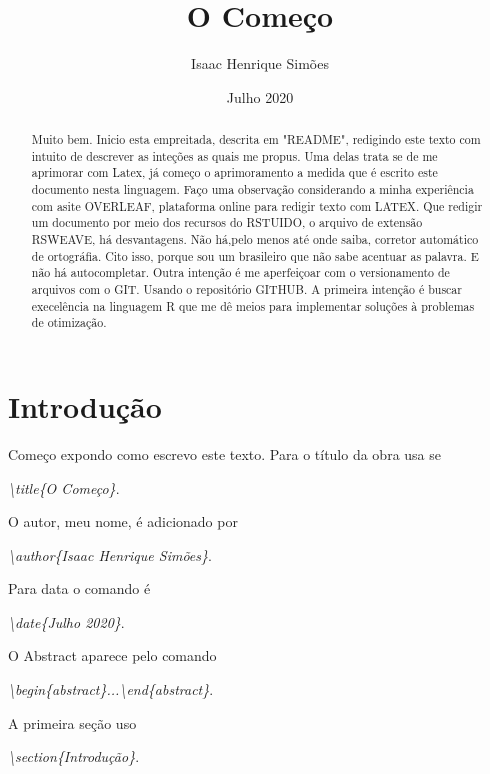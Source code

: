 \documentclass[12pt,twoside]{article}
\title{O Começo}
\author{Isaac Henrique Simões}
\date{Julho 2020}
\begin{document}


  \maketitle

\begin{abstract}
\noindent Muito bem. Inicio esta empreitada, descrita em "README", redigindo este texto com intuito de descrever as inteções as quais me propus. Uma delas trata se de me aprimorar com Latex, já começo o aprimoramento a medida que é escrito este documento nesta linguagem. Faço uma observação considerando a minha experiência com asite OVERLEAF, plataforma online para redigir texto com LATEX. Que redigir um documento por meio dos recursos do RSTUIDO, o arquivo de extensão RSWEAVE, há  desvantagens. Não há,pelo menos até onde saiba, corretor automático de ortográfia. Cito isso, porque sou um brasileiro que não sabe acentuar as palavra. E não há autocompletar.
Outra intenção é me aperfeiçoar com o versionamento de arquivos com o GIT. Usando o repositório GITHUB. 
A primeira intenção é buscar execelência na linguagem R que me dê meios para implementar soluções à problemas de otimização.
\end{abstract}

\section{Introdução}

Começo expondo como escrevo este texto. Para o título da obra usa se \begin{center} \textit{\textbackslash{title}\{O Começo\}}.\end{center} O autor, meu nome, é adicionado por \begin{center} \textit{\textbackslash{author}\{Isaac Henrique Simões\}}. \end{center} Para data o comando é \begin{center}\textit{\textbackslash{date}\{Julho 2020\}}.\end{center} O Abstract aparece pelo comando \begin{center} \textit{\textbackslash{begin}\{abstract\}...\textbackslash{end}\{abstract\}}.\end{center}A primeira seção uso \begin{center}\textit{\textbackslash{section}\{Introdução\}}.\end{center}
\end{document}
